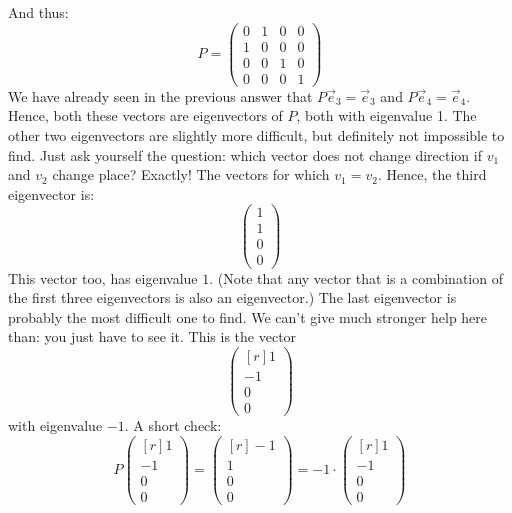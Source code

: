 \documentclass[a4paper]{report}
\begin{document}
\begin{Answer}[ref=eigen3]
\begin{equation*}
\end{equation*}
And thus:
\begin{equation*}
P = \begin{pmatrix} 0 & 1 & 0 & 0 \\ 1 & 0 & 0 & 0 \\ 0 & 0 & 1& 0 \\ 0 & 0 & 0 & 1 \end{pmatrix}
\end{equation*}
\Question We have already seen in the previous answer that $P\vec{e}_3 = \vec{e}_3$ and $P\vec{e}_4 = \vec{e}_4$. Hence, both these vectors are eigenvectors of $P$, both with eigenvalue 1. The other two eigenvectors are slightly more difficult, but definitely not impossible to find. Just ask yourself the question: which vector does not change direction if $v_1$ and $v_2$ change place? Exactly! The vectors for which $v_1 = v_2$. Hence, the third eigenvector is:
\begin{equation*}
\begin{pmatrix} 1 \\ 1 \\ 0 \\ 0 \end{pmatrix}
\end{equation*} 
This vector too, has eigenvalue $1$. (Note that any vector that is a combination of the first three eigenvectors is also an eigenvector.)
The last eigenvector is probably the most difficult one to find. We can't give much stronger help here than: you just have to see it. This is the vector
\begin{equation*}
\begin{pmatrix*}[r] 1 \\ -1 \\ 0 \\ 0 \end{pmatrix*}
\end{equation*} 
with eigenvalue $-1$. A short check:
\begin{equation*}
P \begin{pmatrix*}[r] 1 \\ -1 \\ 0 \\ 0 \end{pmatrix*} = \begin{pmatrix*}[r] -1 \\ 1 \\ 0 \\ 0 \end{pmatrix*} = -1\cdot \begin{pmatrix*}[r] 1 \\ -1 \\ 0 \\ 0 \end{pmatrix*} 

\end{equation*}
\end{Answer}
\end{document}
